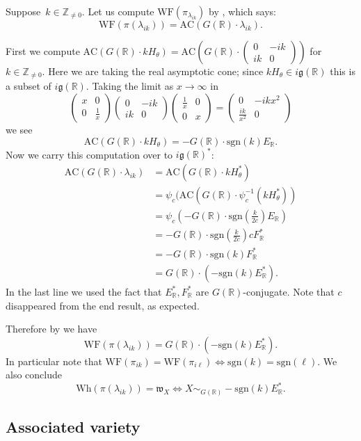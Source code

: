 \documentclass[10pt,leqno]{article}
\numberwithin{equation}{section}
\newcommand{\sgn}{\mathrm{sgn}}
\newcommand{\R}{\mathbb R}
\newcommand{\Z}{\mathbb Z}
\newcommand{\g}{\mathfrak g}
\newcommand\inv{^{-1}}
\newcommand{\w}{\mathfrak w}
\newcommand{\Wh}{\mathrm{Wh}}
\newcommand{\WF}{\mathrm{WF}}
\newcommand{\AC}{\mathrm{AC}}
\begin{document}
Suppose~$k \in \Z_{\neq 0}$. Let us compute $\WF(\pi_{\lambda_{ik}})$ by  \cite{HarrisHeOlafsson}, which says:
$$
\WF(\pi(\lambda_{ik}))=\AC(G(\R)\cdot \lambda_{ik}).
$$

First we compute $\AC(G(\R)\cdot kH_\theta)=\AC(G(\R)\cdot\begin{pmatrix}0&-ik\\ik&0
\end{pmatrix})$ for $k\in \Z_{\ne 0}$.
Here we are taking the real asymptotic cone; since $kH_\theta\in i\g(\R)$ this is a subset of $i\g(\R)$. 
Taking the limit as $x\rightarrow \infty$ in 
$$
\begin{pmatrix}
x&0\\0&\frac 1x
\end{pmatrix}
\begin{pmatrix}0&-ik\\ik&0
\end{pmatrix}\begin{pmatrix}
\frac 1x&0\\0&x
\end{pmatrix}=
\begin{pmatrix}0&-ikx^2\\\frac{ik}{x^2}&0
\end{pmatrix}
$$
we see
$$
\AC(G(\R)\cdot kH_\theta)=-G(\R)\cdot\sgn(k)E_\R.
$$
Now we carry this computation over to $i\g(\R)^*$:
$$
\begin{aligned}
\AC(G(\R)\cdot\lambda_{ik})&=\AC(G(\R)\cdot kH_\theta^*)\\
&=\psi_c(\AC(G(\R)\cdot \psi_c\inv(kH_\theta^*))\\
&=\psi_c(-G(\R)\cdot\sgn(\frac k{2c})E_\R)\\
&=-G(\R)\cdot\sgn(\frac k{2c})cF_\R^*\\
&=-G(\R)\cdot\sgn(k)F_\R^*\\
&=G(\R)\cdot(-\sgn(k)E_\R^*).
\end{aligned}
$$
In the last line we used the fact that $E_\R^*,F_\R^*$ are $G(\R)$-conjugate.
Note that $c$ disappeared from the end result, as expected.

Therefore by 
\cite{HarrisHeOlafsson} we have
\begin{equation}
\label{e:WF}
\WF(\pi(\lambda_{ik}))=G(\R)\cdot (-\sgn(k)E_\R^*).
\end{equation}
In particular note that $\WF(\pi_{ik})=\WF(\pi_{i\ell})\Leftrightarrow \sgn(k)=\sgn(\ell)$.
We also conclude
$$
\Wh(\pi(\lambda_{ik}))=\w_X\Leftrightarrow X\sim_{G(\R)} -\sgn(k)E_\R^*.
$$

\subsection{Associated variety}
\end{document}
